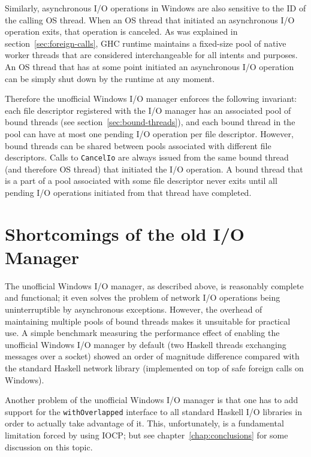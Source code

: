 \documentclass[a4paper,11pt,oneside]{report}
\begin{document}
Similarly, asynchronous I/O operations in Windows are also sensitive to the ID
of the calling OS thread. When an OS thread that initiated an asynchronous I/O
operation exits, that operation is canceled. As was explained in
section~\ref{sec:foreign-calls}, GHC runtime maintains a fixed-size pool of
native worker threads that are considered interchangeable for all intents and
purposes. An OS thread that has at some point initiated an asynchronous I/O
operation can be simply shut down by the runtime at any moment.

Therefore the unofficial Windows I/O manager enforces the following invariant:
each file descriptor registered with the I/O manager has an associated pool of
bound threads (see section~\ref{sec:bound-threads}), and each bound thread in
the pool can have at most one pending I/O operation per file
descriptor. However, bound threads can be shared between pools associated with
different file descriptors. Calls to \texttt{CancelIo} are always issued from
the same bound thread (and therefore OS thread) that initiated the I/O
operation. A bound thread that is a part of a pool associated with some file
descriptor never exits until all pending I/O operations initiated from that
thread have completed.

\section{Shortcomings of the old I/O Manager}
\label{sec:shortcomings-old-io-manager}

The unofficial Windows I/O manager, as described above, is reasonably complete
and functional; it even solves the problem of network I/O operations being
uninterruptible by asynchronous exceptions. However, the overhead of maintaining
multiple pools of bound threads makes it unsuitable for practical use. A simple
benchmark measuring the performance effect of enabling the unofficial Windows
I/O manager by default (two Haskell threads exchanging messages over a socket)
showed an order of magnitude difference compared with the standard Haskell
network library (implemented on top of safe foreign calls on Windows).

Another problem of the unofficial Windows I/O manager is that one has to add
support for the \texttt{withOverlapped} interface to all standard Haskell I/O
libraries in order to actually take advantage of it. This, unfortunately, is a
fundamental limitation forced by using IOCP; but see
chapter~\ref{chap:conclusions} for some discussion on this topic.
\end{document}

